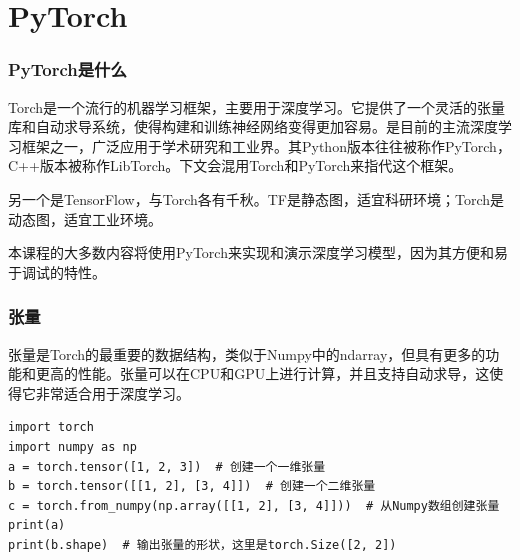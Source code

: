 % 
%
%

\section{PyTorch}

\begin{frame}[fragile]
    \frametitle{PyTorch是什么}

    Torch是一个流行的机器学习框架，主要用于深度学习。它提供了一个灵活的张量库和自动求导系统，使得构建和训练神经网络变得更加容易。是目前的主流深度学习框架之一，广泛应用于学术研究和工业界。其Python版本往往被称作PyTorch，C++版本被称作LibTorch。下文会混用Torch和PyTorch来指代这个框架。

    另一个是TensorFlow，与Torch各有千秋。TF是静态图，适宜科研环境；Torch是动态图，适宜工业环境。

    本课程的大多数内容将使用PyTorch来实现和演示深度学习模型，因为其方便和易于调试的特性。

\end{frame}

\begin{frame}[fragile]
    \frametitle{张量}

    张量是Torch的最重要的数据结构，类似于Numpy中的ndarray，但具有更多的功能和更高的性能。张量可以在CPU和GPU上进行计算，并且支持自动求导，这使得它非常适合用于深度学习。

    \begin{verbatim}
import torch
import numpy as np
a = torch.tensor([1, 2, 3])  # 创建一个一维张量
b = torch.tensor([[1, 2], [3, 4]])  # 创建一个二维张量
c = torch.from_numpy(np.array([[1, 2], [3, 4]]))  # 从Numpy数组创建张量
print(a)
print(b.shape)  # 输出张量的形状，这里是torch.Size([2, 2])
    \end{verbatim}

\end{frame}

